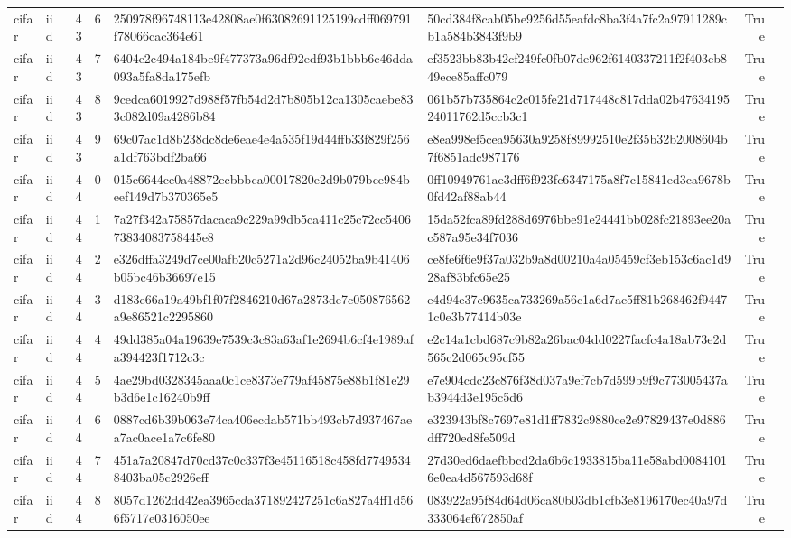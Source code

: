 \begin{tabular}{llrrllrl}
cifar & iid & 43 & 6 & 250978f96748113e42808ae0f63082691125199cdff069791f78066cac364e61 & 50cd384f8cab05be9256d55eafdc8ba3f4a7fc2a97911289cb1a584b3843f9b9 & True &  \\
cifar & iid & 43 & 7 & 6404e2c494a184be9f477373a96df92edf93b1bbb6c46dda093a5fa8da175efb & ef3523bb83b42cf249fc0fb07de962f6140337211f2f403cb849ece85affc079 & True &  \\
cifar & iid & 43 & 8 & 9cedca6019927d988f57fb54d2d7b805b12ca1305caebe833c082d09a4286b84 & 061b57b735864c2c015fe21d717448c817dda02b4763419524011762d5ccb3c1 & True &  \\
cifar & iid & 43 & 9 & 69c07ac1d8b238dc8de6eae4e4a535f19d44ffb33f829f256a1df763bdf2ba66 & e8ea998ef5cea95630a9258f89992510e2f35b32b2008604b7f6851adc987176 & True &  \\
cifar & iid & 44 & 0 & 015c6644ce0a48872ecbbbca00017820e2d9b079bce984beef149d7b370365e5 & 0ff10949761ae3dff6f923fc6347175a8f7c15841ed3ca9678b0fd42af88ab44 & True &  \\
cifar & iid & 44 & 1 & 7a27f342a75857dacaca9c229a99db5ca411c25c72cc540673834083758445e8 & 15da52fca89fd288d6976bbe91e24441bb028fc21893ee20ac587a95e34f7036 & True &  \\
cifar & iid & 44 & 2 & e326dffa3249d7ce00afb20c5271a2d96c24052ba9b41406b05bc46b36697e15 & ce8fe6f6e9f37a032b9a8d00210a4a05459cf3eb153c6ac1d928af83bfc65e25 & True &  \\
cifar & iid & 44 & 3 & d183e66a19a49bf1f07f2846210d67a2873de7c050876562a9e86521c2295860 & e4d94e37c9635ca733269a56c1a6d7ac5ff81b268462f94471c0e3b77414b03e & True &  \\
cifar & iid & 44 & 4 & 49dd385a04a19639e7539c3c83a63af1e2694b6cf4e1989afa394423f1712c3c & e2c14a1cbd687c9b82a26bac04dd0227facfc4a18ab73e2d565c2d065c95cf55 & True &  \\
cifar & iid & 44 & 5 & 4ae29bd0328345aaa0c1ce8373e779af45875e88b1f81e29b3d6e1c16240b9ff & e7e904cdc23c876f38d037a9ef7cb7d599b9f9c773005437ab3944d3e195c5d6 & True &  \\
cifar & iid & 44 & 6 & 0887cd6b39b063e74ca406ecdab571bb493cb7d937467aea7ac0ace1a7c6fe80 & e323943bf8c7697e81d1ff7832c9880ce2e97829437e0d886dff720ed8fe509d & True &  \\
cifar & iid & 44 & 7 & 451a7a20847d70cd37c0c337f3e45116518c458fd77495348403ba05c2926eff & 27d30ed6daefbbcd2da6b6c1933815ba11e58abd00841016e0ea4d567593d68f & True &  \\
cifar & iid & 44 & 8 & 8057d1262dd42ea3965cda371892427251c6a827a4ff1d566f5717e0316050ee & 083922a95f84d64d06ca80b03db1cfb3e8196170ec40a97d333064ef672850af & True &  \\

\end{tabular}
